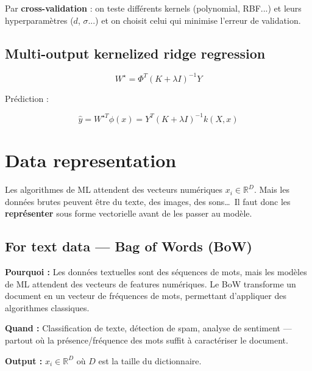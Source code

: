 \documentclass[11pt,a4paper,openany]{book}
\begin{document}
Par \textbf{cross-validation} : on teste différents kernels (polynomial, RBF...) et leurs hyperparamètres ($d$, $\sigma$...) et on choisit celui qui minimise l'erreur de validation.

\vspace{1cm}

\subsection{Multi-output kernelized ridge regression}

\[
W^\star
=
\Phi^T (K + \lambda I)^{-1} Y
\]

\vspace{0.5cm}

Prédiction :

\[
\hat{y}
=
W^{\star T} \phi(x)
=
Y^T (K + \lambda I)^{-1} k(X,x)
\]


\vspace{8cm}

\newpage \section{Data representation}

Les algorithmes de ML attendent des vecteurs numériques $x_i \in \mathbb{R}^D$. Mais les données brutes peuvent être du texte, des images, des sons\dots\ Il faut donc les \textbf{représenter} sous forme vectorielle avant de les passer au modèle.

\subsection{For text data — Bag of Words (BoW)}

\begin{rembox}[title=Pourquoi et quand utiliser le Bag of Words ?]
\textbf{Pourquoi :} Les données textuelles sont des séquences de mots, mais les modèles de ML attendent des vecteurs de features numériques. Le BoW transforme un document en un vecteur de fréquences de mots, permettant d'appliquer des algorithmes classiques.

\textbf{Quand :} Classification de texte, détection de spam, analyse de sentiment — partout où la présence/fréquence des mots suffit à caractériser le document.

\textbf{Output :} $x_i \in \mathbb{R}^D$ où $D$ est la taille du dictionnaire.
\end{rembox}
\end{document}
